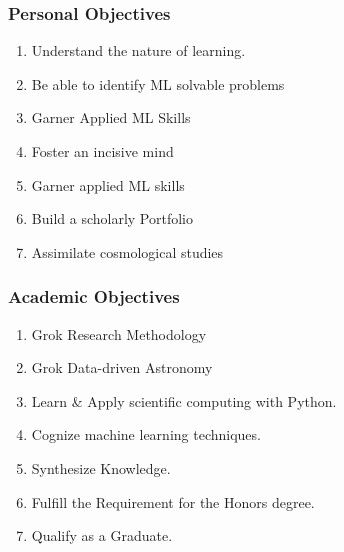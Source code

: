 \subsubsection{Personal Objectives}
\begin{enumerate}
	\item Understand the nature of learning.
	\item Be able to identify ML solvable problems
	\item Garner Applied ML Skills
	\item Foster an incisive mind
	\item Garner applied ML skills
	\item Build a scholarly Portfolio
	\item Assimilate cosmological studies
\end{enumerate}

\subsubsection{Academic Objectives}
\begin{enumerate}
	\item Grok Research Methodology
	\item Grok Data-driven Astronomy
	\item Learn \& Apply scientific computing with Python.
	\item Cognize machine learning techniques.
	\item Synthesize Knowledge.
	\item Fulfill the Requirement for the Honors degree.
	\item Qualify as a Graduate.
\end{enumerate}
